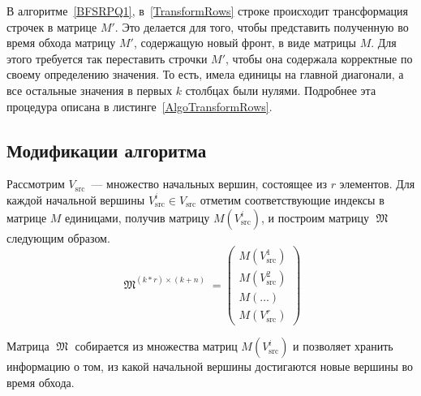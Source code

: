 В алгоритме~\ref{BFSRPQ1}, в~\ref{TransformRows} строке происходит трансформация строчек в матрице $M'$.
Это делается для того, чтобы представить полученную во время обхода матрицу $M'$, содержащую новый фронт, в виде матрицы $M$.
Для этого требуется так переставить строчки $M'$, чтобы она содержала корректные по своему определению значения.
То есть, имела единицы на главной диагонали, а все остальные значения в первых $k$ столбцах были нулями.
Подробнее эта процедура описана в листинге~\ref{AlgoTransformRows}.


\subsection{Модификации алгоритма}

Рассмотрим $V_{\mathrm{src}}$~--- множество начальных вершин, состоящее из $r$ элементов.
Для каждой начальной вершины $V_{\mathrm{src}}^i \in V_{\mathrm{src}}$ отметим соответствующие индексы в матрице $M$ единицами, получив матрицу $M(V_{\mathrm{src}}^i)$, и построим матрицу $\mfrakM$ следующим образом.
\[
    \mfrakM^{(k*r) \times (k + n)} = \begin{pmatrix}
        M(V_{\mathrm{src}}^1) \\
        M(V_{\mathrm{src}}^2) \\
        M(\dots)              \\
        M(V_{\mathrm{src}}^r)
    \end{pmatrix}
\]

Матрица $\mfrakM$ собирается из множества матриц $M(V_{\mathrm{src}}^i)$ и позволяет хранить информацию о том, из какой начальной вершины достигаются новые вершины во время обхода.


